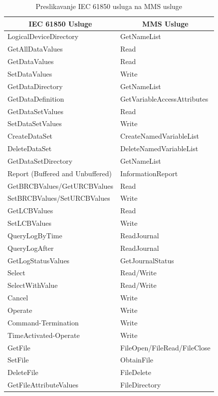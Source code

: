 \documentclass[times, utf8, zavrsni]{fer}
\begin{document}
\begin{table}[tph]
    \centering
    \begin{tabular}{ |l|l| }
        \hline
        \multicolumn{1}{|c|}{\textbf{IEC 61850 Usluge}} &
        \multicolumn{1}{|c|}{\textbf{MMS Usluge}} \\
        \hline \hline
        LogicalDeviceDirectory & GetNameList \\
        \hline
        GetAllDataValues & Read \\
        \hline
        GetDataValues & Read \\
        \hline
        SetDataValues & Write \\
        \hline
        GetDataDirectory & GetNameList \\
        \hline
        GetDataDefinition & GetVariableAccessAttributes \\
        \hline
        GetDataSetValues & Read \\
        \hline
        SetDataSetValues & Write \\
        \hline
        CreateDataSet & CreateNamedVariableList \\
        \hline
        DeleteDataSet & DeleteNamedVariableList \\
        \hline
        GetDataSetDirectory & GetNameList \\
        \hline
        Report (Buffered and Unbuffered) & InformationReport \\
        \hline
        GetBRCBValues/GetURCBValues & Read \\
        \hline
        SetBRCBValues/SetURCBValues & Write \\
        \hline
        GetLCBValues & Read \\
        \hline
        SetLCBValues & Write \\
        \hline
        QueryLogByTime & ReadJournal \\
        \hline
        QueryLogAfter & ReadJournal \\
        \hline
        GetLogStatusValues & GetJournalStatus \\
        \hline
        Select & Read/Write \\
        \hline
        SelectWithValue & Read/Write \\
        \hline
        Cancel & Write \\
        \hline
        Operate & Write \\
        \hline
        Command-Termination & Write \\
        \hline
        TimeActivated-Operate & Write \\
        \hline
        GetFile & FileOpen/FileRead/FileClose \\
        \hline
        SetFile & ObtainFile \\
        \hline
        DeleteFile & FileDelete \\
        \hline
        GetFileAttributeValues & FileDirectory \\
        \hline
    \end{tabular}
    \caption{Preslikavanje IEC 61850 usluga na MMS usluge\footnotemark}
    \label{tab:iec-to-mms-services}
\end{table}
\end{document}
